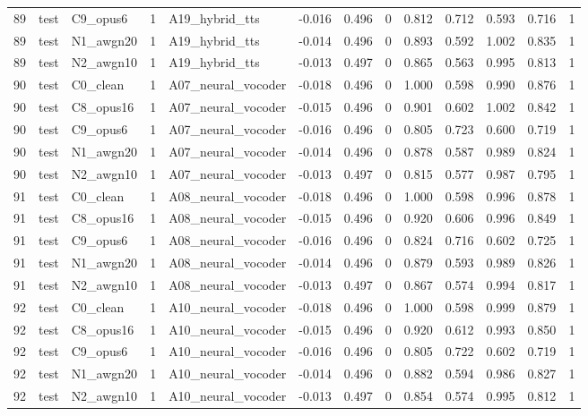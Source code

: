\begin{tabular}{rllrlrrrrrrrr}
89 & test & C9_opus6 & 1 & A19_hybrid_tts & -0.016 & 0.496 & 0 & 0.812 & 0.712 & 0.593 & 0.716 & 1 \\
89 & test & N1_awgn20 & 1 & A19_hybrid_tts & -0.014 & 0.496 & 0 & 0.893 & 0.592 & 1.002 & 0.835 & 1 \\
89 & test & N2_awgn10 & 1 & A19_hybrid_tts & -0.013 & 0.497 & 0 & 0.865 & 0.563 & 0.995 & 0.813 & 1 \\
90 & test & C0_clean & 1 & A07_neural_vocoder & -0.018 & 0.496 & 0 & 1.000 & 0.598 & 0.990 & 0.876 & 1 \\
90 & test & C8_opus16 & 1 & A07_neural_vocoder & -0.015 & 0.496 & 0 & 0.901 & 0.602 & 1.002 & 0.842 & 1 \\
90 & test & C9_opus6 & 1 & A07_neural_vocoder & -0.016 & 0.496 & 0 & 0.805 & 0.723 & 0.600 & 0.719 & 1 \\
90 & test & N1_awgn20 & 1 & A07_neural_vocoder & -0.014 & 0.496 & 0 & 0.878 & 0.587 & 0.989 & 0.824 & 1 \\
90 & test & N2_awgn10 & 1 & A07_neural_vocoder & -0.013 & 0.497 & 0 & 0.815 & 0.577 & 0.987 & 0.795 & 1 \\
91 & test & C0_clean & 1 & A08_neural_vocoder & -0.018 & 0.496 & 0 & 1.000 & 0.598 & 0.996 & 0.878 & 1 \\
91 & test & C8_opus16 & 1 & A08_neural_vocoder & -0.015 & 0.496 & 0 & 0.920 & 0.606 & 0.996 & 0.849 & 1 \\
91 & test & C9_opus6 & 1 & A08_neural_vocoder & -0.016 & 0.496 & 0 & 0.824 & 0.716 & 0.602 & 0.725 & 1 \\
91 & test & N1_awgn20 & 1 & A08_neural_vocoder & -0.014 & 0.496 & 0 & 0.879 & 0.593 & 0.989 & 0.826 & 1 \\
91 & test & N2_awgn10 & 1 & A08_neural_vocoder & -0.013 & 0.497 & 0 & 0.867 & 0.574 & 0.994 & 0.817 & 1 \\
92 & test & C0_clean & 1 & A10_neural_vocoder & -0.018 & 0.496 & 0 & 1.000 & 0.598 & 0.999 & 0.879 & 1 \\
92 & test & C8_opus16 & 1 & A10_neural_vocoder & -0.015 & 0.496 & 0 & 0.920 & 0.612 & 0.993 & 0.850 & 1 \\
92 & test & C9_opus6 & 1 & A10_neural_vocoder & -0.016 & 0.496 & 0 & 0.805 & 0.722 & 0.602 & 0.719 & 1 \\
92 & test & N1_awgn20 & 1 & A10_neural_vocoder & -0.014 & 0.496 & 0 & 0.882 & 0.594 & 0.986 & 0.827 & 1 \\
92 & test & N2_awgn10 & 1 & A10_neural_vocoder & -0.013 & 0.497 & 0 & 0.854 & 0.574 & 0.995 & 0.812 & 1 \\

\end{tabular}
